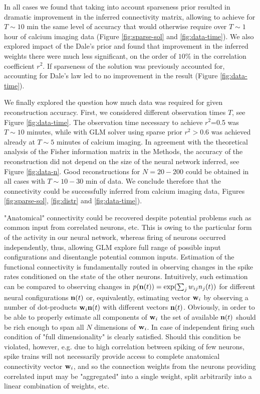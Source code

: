 \documentclass[amsmath,amssymb]{revtex4}
\begin{document}
In all cases we found that taking into account sparseness prior resulted in dramatic improvement in the inferred connectivity matrix, allowing to achieve for $T\sim 10$ min the same level of accuracy that would otherwise require over $T\sim 1$ hour of calcium imaging data (Figure \ref{fig:sparse-sol} and \ref{fig:data-time}). We also explored impact of the Dale's prior and found that improvement in the inferred weights there were much less significant, on the order of $10\%$ in the correlation coefficient $r^2$. If sparseness of the solution was previously accounted for, accounting for Dale's law led to no improvement in the result (Figure \ref{fig:data-time}).

We finally explored the question how much data was required for given reconstruction accuracy. First, we considered different observation times $T$, see Figure \ref{fig:data-time}. The observation time necessary to achieve $r^2$=0.5 was $T\sim 10$ minutes, while with GLM solver using sparse prior $r^2>0.6$ was achieved already at $T\sim 5$ minutes of calcium imaging. In agreement with the theoretical analysis of the Fisher information matrix in the Methods, the accuracy of the reconstruction did not depend on the size of the neural network inferred, see Figure \ref{fig:data-n}. Good reconstructions for $N=20-200$ could be obtained in all cases with $T\sim 10-30$ min of data. We conclude therefore that the connectivity could be successfully inferred from calcium imaging data, Figures \ref{fig:sparse-sol}, \ref{fig:distr} and \ref{fig:data-time}).

"Anatomical" connectivity could be recovered despite potential problems such as common input from correlated neurons, etc. This is owing to the particular form of the activity in our neural network, whereas firing of neurons occurred independently, thus, allowing GLM explore full range of possible input configurations and disentangle potential common inputs.
Estimation of the functional connectivity is fundamentally routed in observing changes in the spike rates conditioned on the state of the other neurons. Intuitively, such estimation can be compared to observing changes in $p({\bf n}(t))=\exp(\sum_j w_{ij}n_j(t))$ for different neural configurations ${\bf n}(t)$ or, equivalently, estimating vector ${\bf w}_i$ by observing a number of dot-products ${\bf w}_i {\bf n}(t)$ with different vectors ${\bf n}(t)$. Obviously, in order to be able to properly estimate all components of ${\bf w}_i$ the set of available ${\bf n}(t)$ should be rich enough to span all $N$ dimensions of ${\bf w}_i$. In case of independent firing such condition of "full dimensionality" is clearly satisfied.
Should this condition be violated, however, e.g. due to high correlation between spiking of few neurons, spike trains will not necessarily provide access to complete anatomical connectivity vector ${\bf w}_i$, and so the connection weights from the neurons providing correlated input may be "aggregated" into a single weight, split arbitrarily into a linear combination of weights, etc.
\end{document}
